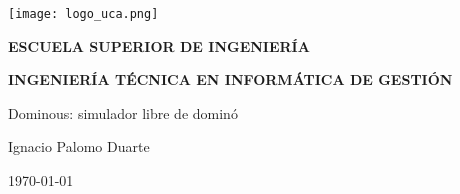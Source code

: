 

\begin{titlepage}

  \begin{center}

    \texttt{[image: logo\_uca.png]} \\
    
    \vspace{2.0cm}
    
    \LARGE{\textbf{ESCUELA SUPERIOR DE INGENIERÍA}} \\
    
    \vspace{1.0cm}
    
    \Large{\textbf{INGENIERÍA TÉCNICA EN INFORMÁTICA DE GESTIÓN}} \\
    
    \vspace{3.0cm}
    
    \Large{Dominous: simulador libre de dominó} \\
    
    \vspace{2.0cm}
    
    \Large{Ignacio Palomo Duarte} \\
  
    \vspace{0.5cm}

    \large{\today}
    
  \end{center}
\end{titlepage}
